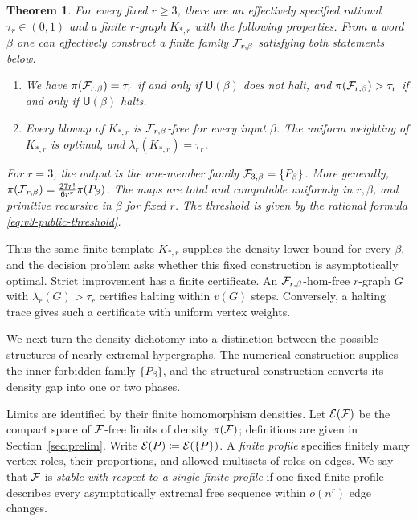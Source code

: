 \documentclass[10pt]{article}
\numberwithin{equation}{section}
\newtheorem{theorem}{Theorem}[section]
\theoremstyle{definition}
\begin{document}
\begin{theorem}\label{thm:numerical}
For every fixed $r\ge3$, there are an effectively specified rational $\tau_r\in(0,1)$ and a finite $r$-graph $K_{*,r}$ with the following properties. From a word $\beta$ one can effectively construct a finite family $\mathcal F_{r,\beta}$ satisfying both statements below.
\begin{enumerate}
\item We have $\pi(\mathcal F_{r,\beta})=\tau_r$ if and only if $\mathsf U(\beta)$ does not halt, and $\pi(\mathcal F_{r,\beta})>\tau_r$ if and only if $\mathsf U(\beta)$ halts.
\item Every blowup of $K_{*,r}$ is $\mathcal F_{r,\beta}$-free for every input $\beta$. The uniform weighting of $K_{*,r}$ is optimal, and $\lambda_r(K_{*,r})=\tau_r$.
\end{enumerate}
For $r=3$, the output is the one-member family $\mathcal F_{3,\beta}=\{P_\beta\}$. More generally, $\pi(\mathcal F_{r,\beta})=\frac{27r!}{6r^r}\pi(P_\beta)$. The maps are total and computable uniformly in $r,\beta$, and primitive recursive in $\beta$ for fixed $r$. The threshold is given by the rational formula \eqref{eq:v3-public-threshold}.
\end{theorem}
Thus the same finite template $K_{*,r}$ supplies the density lower bound for every $\beta$, and the decision problem asks whether this fixed construction is asymptotically optimal. Strict improvement has a finite certificate. An $\mathcal F_{r,\beta}$-hom-free $r$-graph $G$ with $\lambda_r(G)>\tau_r$ certifies halting within $v(G)$ steps. Conversely, a halting trace gives such a certificate with uniform vertex weights.

We next turn the density dichotomy into a distinction between the possible structures of nearly extremal hypergraphs. The numerical construction supplies the inner forbidden family $\{P_\beta\}$, and the structural construction converts its density gap into one or two phases.

Limits are identified by their finite homomorphism densities. Let $\mathcal E(\mathcal F)$ be the compact space of $\mathcal F$-free limits of density $\pi(\mathcal F)$; definitions are given in Section~\ref{sec:prelim}. Write $\mathcal E(P)\coloneqq\mathcal E(\{P\})$. A \emph{finite profile} specifies finitely many vertex roles, their proportions, and allowed multisets of roles on edges. We say that $\mathcal F$ is \emph{stable with respect to a single finite profile} if one fixed finite profile describes every asymptotically extremal free sequence within $o(n^r)$ edge changes.
\end{document}
